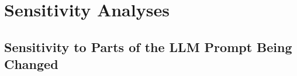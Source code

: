 
\section{Sensitivity Analyses}
\label{apd:sensitivity-analyses}



\subsection{Sensitivity to Parts of the LLM Prompt Being Changed}
\label{apd:sensitivity-llm-prompt}

